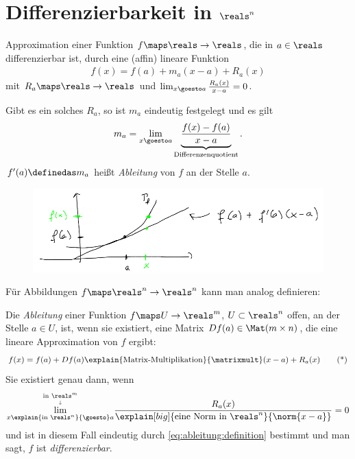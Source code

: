 \chapter{Differenzierbarkeit in \texorpdfstring{\( \reals^n \)}{R\^n}}
\begin{erinnerung*}
    Approximation einer Funktion \( f\maps \reals\to \reals \), die in \( a\in \reals \) differenzierbar ist, durch eine (affin) lineare Funktion
    \begin{align*}
        f(x)=f(a)+m_a(x-a)+R_a(x)
    \end{align*}
    mit \( R_a\maps \reals\to \reals \) und \( \lim_{x \goesto a}\frac{R_a(x)}{x-a}=0 \).

    Gibt es ein solches \( R_a \), so ist \( m_a \) eindeutig festgelegt und es gilt
    \begin{align*}
        m_a=\lim_{x \goesto a}\underbrace{\frac{f(x)-f(a)}{x-a}}_{\text{Differenzenquotient}}.
    \end{align*}
    \( f'(a)\definedas m_a \) heißt \emph{Ableitung} von \( f \) an der Stelle \( a \).
    \begin{figure}[H]
        \centering
        \includegraphics[width=0.7\linewidth]{figures/ableitung_erinnerung}
        \label{fig:ableitung_erinnerung}
    \end{figure}
    Für Abbildungen \( f\maps \reals^n\to \reals^n \) kann man analog definieren:
\end{erinnerung*}
\begin{definition}
    Die \emph{Ableitung} einer Funktion \( f\maps U\to \reals^m \), \( U\subset \reals^n \) offen, an der Stelle \( a\in U \), ist, wenn sie existiert, eine Matrix \( Df(a)\in \Mat(m\times n) \), die eine lineare Approximation von \( f \) ergibt:
    \begin{align*}
        f(x)=f(a)+Df(a)\explain{\text{Matrix-Multiplikation}}{\matrixmult}(x-a)+R_a(x)\tag{*}\label{eq:ableitung:definition}
    \end{align*}
    Sie existiert genau dann, wenn
    \begin{align*}
        \overset{\underset{\downarrow}{\text{in }\reals^m}}{\lim_{x\explain{\text{in }\reals^n}{\goesto} a}}\frac{R_a(x)}{\explain[big]{\text{eine Norm in \( \reals^n \)}}{\norm{x-a}}}=0
    \end{align*}
    und ist in diesem Fall eindeutig durch \eqref{eq:ableitung:definition} bestimmt und man sagt, \( f \) ist \emph{differenzierbar}.
\end{definition}
